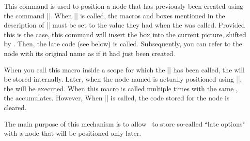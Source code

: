\begin{command}{\pgfpositionnodenow{}}
    This command is used to position a node that has previously been created
    using the command |\pgfpositionnodelater|. When |\pgfpositionnodenow| is
    called, the macros and boxes mentioned in the description of
    |\pgfpositionnodenow| must be set to the value they had when the
     was called. Provided this is the case, this command will
    insert the box into the current picture, shifted by .
    Then, the late code (see below) is called. Subsequently, you can refer to
    the node with its original name as if it had just been created.
\begin{codeexample}[]
\newbox\mybox

\def\mysaver{
  \global\setbox\mybox=\box\pgfpositionnodelaterbox
  \global\let\myname=\pgfpositionnodelatername
  \global\let\myminx=\pgfpositionnodelaterminx
  \global\let\myminy=\pgfpositionnodelaterminy
  \global\let\mymaxx=\pgfpositionnodelatermaxx
  \global\let\mymaxy=\pgfpositionnodelatermaxy
}

\end{codeexample}
\end{command}

\begin{command}{\pgfnodepostsetupcode{}}
    When you call this macro inside a scope for which the
    |\pgfpositionnodelater| has been called, the  will be stored
    internally. Later, when the node named  is actually
    positioned using |\pgfpositionnodenow|, the  will be executed.
    When this macro is called multiple times with the same ,
    the  accumulates. However, When |\pgfpositionnodenow| is called,
    the code stored for the node is cleared.

    The main purpose of this mechanism is to allow \tikzname\ to store
    so-called ``late options'' with a node that will be positioned only later.
\end{command}


